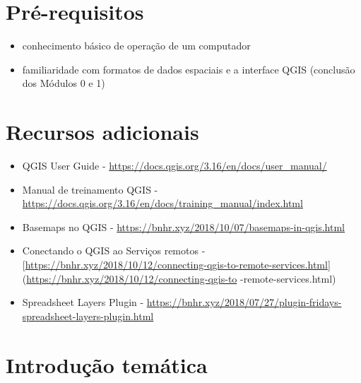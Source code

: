 \documentclass[
]{book}
\providecommand{\tightlist}{%
  \setlength{\itemsep}{0pt}\setlength{\parskip}{0pt}}
\begin{document}
\hypertarget{pruxe9-requisitos-2}{%
\section{Pré-requisitos}\label{pruxe9-requisitos-2}}

\begin{itemize}
\tightlist
\item
  conhecimento básico de operação de um computador
\item
  familiaridade com formatos de dados espaciais e a interface QGIS (conclusão dos Módulos 0 e 1)
\end{itemize}

\hypertarget{recursos-adicionais-2}{%
\section{Recursos adicionais}\label{recursos-adicionais-2}}

\begin{itemize}
\tightlist
\item
  QGIS User Guide - \url{https://docs.qgis.org/3.16/en/docs/user_manual/}
\item
  Manual de treinamento QGIS - \url{https://docs.qgis.org/3.16/en/docs/training_manual/index.html}
\item
  Basemaps no QGIS - \url{https://bnhr.xyz/2018/10/07/basemaps-in-qgis.html}
\item
  Conectando o QGIS ao Serviços remotos - {[}\url{https://bnhr.xyz/2018/10/12/connecting-qgis-to-remote-services.html}{]} (\url{https://bnhr.xyz/2018/10/12/connecting-qgis-to} -remote-services.html)
\item
  Spreadsheet Layers Plugin - \href{https://bnhr.xyz/2018/\%2027/07\%20/\%20plugin-fridays-spreadsheet-layers-plugin.html}{https://bnhr.xyz/2018/07/27/plugin-fridays-spreadsheet-layers-plugin.html}
\end{itemize}

\hypertarget{introduuxe7uxe3o-temuxe1tica-2}{%
\section{Introdução temática}\label{introduuxe7uxe3o-temuxe1tica-2}}
\end{document}

